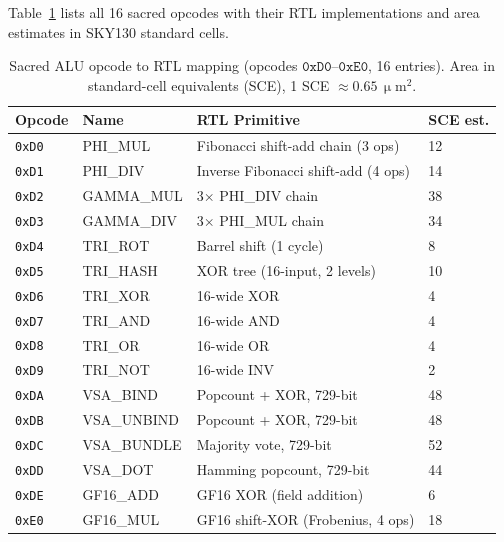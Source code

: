 Table~\ref{tab:72:opcodes} lists all 16 sacred opcodes with their
RTL implementations and area estimates in SKY130 standard cells.

\begin{table}[H]
\centering
\caption{Sacred ALU opcode to RTL mapping
  (opcodes $\mathtt{0xD0}$--$\mathtt{0xE0}$, 16 entries).
  Area in standard-cell equivalents (SCE), 1 SCE $\approx 0.65\,\upmu\mathrm{m}^2$.}
\label{tab:72:opcodes}
\small
\begin{tabular}{llll}
\toprule
Opcode & Name & RTL Primitive & SCE est. \\
\midrule
\texttt{0xD0} & \textsc{PHI\_MUL}    & Fibonacci shift-add chain (3 ops)  & 12 \\
\texttt{0xD1} & \textsc{PHI\_DIV}    & Inverse Fibonacci shift-add (4 ops)& 14 \\
\texttt{0xD2} & \textsc{GAMMA\_MUL}  & 3$\times$ \textsc{PHI\_DIV} chain  & 38 \\
\texttt{0xD3} & \textsc{GAMMA\_DIV}  & 3$\times$ \textsc{PHI\_MUL} chain  & 34 \\
\texttt{0xD4} & \textsc{TRI\_ROT}    & Barrel shift (1 cycle)             &  8 \\
\texttt{0xD5} & \textsc{TRI\_HASH}   & XOR tree (16-input, 2 levels)      & 10 \\
\texttt{0xD6} & \textsc{TRI\_XOR}    & 16-wide XOR                        &  4 \\
\texttt{0xD7} & \textsc{TRI\_AND}    & 16-wide AND                        &  4 \\
\texttt{0xD8} & \textsc{TRI\_OR}     & 16-wide OR                         &  4 \\
\texttt{0xD9} & \textsc{TRI\_NOT}    & 16-wide INV                        &  2 \\
\texttt{0xDA} & \textsc{VSA\_BIND}   & Popcount + XOR, 729-bit            & 48 \\
\texttt{0xDB} & \textsc{VSA\_UNBIND} & Popcount + XOR, 729-bit            & 48 \\
\texttt{0xDC} & \textsc{VSA\_BUNDLE} & Majority vote, 729-bit             & 52 \\
\texttt{0xDD} & \textsc{VSA\_DOT}    & Hamming popcount, 729-bit          & 44 \\
\texttt{0xDE} & \textsc{GF16\_ADD}   & GF16 XOR (field addition)          &  6 \\
\texttt{0xE0} & \textsc{GF16\_MUL}   & GF16 shift-XOR (Frobenius, 4 ops) & 18 \\
\bottomrule
\end{tabular}
\end{table}

